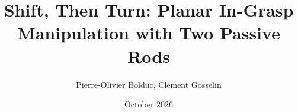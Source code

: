 \documentclass[12pt]{article}
\title{Shift, Then Turn: Planar In-Grasp Manipulation with Two Passive Rods}
\author{Pierre-Olivier Bolduc, Clément Gosselin}
\date{October 2026}
\begin{document}
\maketitle












\FloatBarrier


\begingroup
\small

\endgroup
\end{document}
